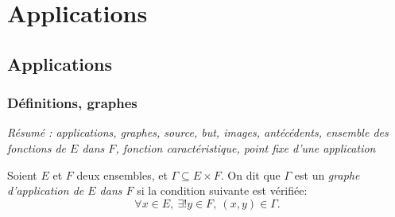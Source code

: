 \chapter{Applications}
\minitoc
\hyperlink{toc}{\retourTOC}




\section{Applications}

\subsection{Définitions, graphes}

\emph{Résumé : applications, graphes, source, but, images, antécédents, ensemble des fonctions de $E$ dans $F$, fonction caractéristique, point fixe d'une application}

\begin{definition}\label{def-graphe}
Soient $E$ et $F$ deux ensembles, et $\Gamma \subseteq E\times F$. On dit que $\Gamma$ est un \emph{graphe d'application de $E$ dans $F$} si la condition suivante est vérifiée:
\[\forall x\in E, \: \exists! y\in F, \: (x,y) \in \Gamma.\]
\end{definition}


